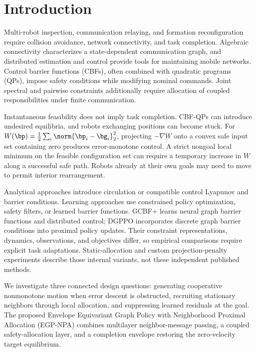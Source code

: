 \section{Introduction}\label{sec:intro}
Multi-robot inspection, communication relaying, and formation reconfiguration require collision avoidance, network connectivity, and task completion. Algebraic connectivity characterizes a state-dependent communication graph, and distributed estimation and control provide tools for maintaining mobile networks\cite{yang2010decentralized,sabattini2013decentralized,ong2021connectivity}. Control barrier functions (CBFs), often combined with quadratic programs (QPs), impose safety conditions while modifying nominal commands\cite{ames2017cbf,breeden2022sampled}. Joint spectral and pairwise constraints additionally require allocation of coupled responsibilities under finite communication\cite{tan2025violationfree}.

Instantaneous feasibility does not imply task completion. CBF-QPs can introduce undesired equilibria, and robots exchanging positions can become stuck\cite{reis2021,tan2024equilibria,grover2023deadlock}. For $W(\bp)=\frac12\sum_i\norm{\bp_i-\bg_i}_2^2$, projecting $-\nabla W$ onto a convex safe input set containing zero produces error-monotone control\cite{allibhoy2024safegradient}. A strict nongoal local minimum on the feasible configuration set can require a temporary increase in $W$ along a successful safe path. Robots already at their own goals may need to move to permit interior rearrangement.

Analytical approaches introduce circulation or compatible control Lyapunov and barrier conditions\cite{goncalves2023circulation,dai2024compatible}. Learning approaches use constrained policy optimization, safety filters, or learned barrier functions\cite{gu2023safe,wabersich2021}. GCBF+ learns neural graph barrier functions and distributed control\cite{zhang2025gcbf}; DGPPO incorporates discrete graph barrier conditions into proximal policy updates\cite{zhang2025dgppo}. Their constraint representations, dynamics, observations, and objectives differ, so empirical comparisons require explicit task adaptations. Static-allocation and custom projection-penalty experiments describe those internal variants, not these independent published methods.

We investigate three connected design questions: generating cooperative nonmonotone motion when error descent is obstructed, recruiting stationary neighbors through local allocation, and suppressing learned residuals at the goal. The proposed Envelope Equivariant Graph Policy with Neighborhood Proximal Allocation (EGP-NPA) combines multilayer neighbor-message passing, a coupled safety-allocation layer, and a completion envelope restoring the zero-velocity target equilibrium.

